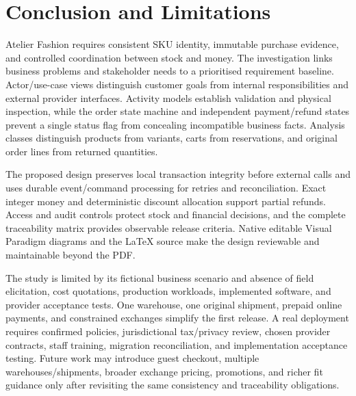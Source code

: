 \chapter{Conclusion and Limitations}
Atelier Fashion requires consistent SKU identity, immutable purchase evidence, and controlled coordination between stock and money. The investigation links business problems and stakeholder needs to a prioritised requirement baseline. Actor/use-case views distinguish customer goals from internal responsibilities and external provider interfaces. Activity models establish validation and physical inspection, while the order state machine and independent payment/refund states prevent a single status flag from concealing incompatible business facts. Analysis classes distinguish products from variants, carts from reservations, and original order lines from returned quantities.

The proposed design preserves local transaction integrity before external calls and uses durable event/command processing for retries and reconciliation. Exact integer money and deterministic discount allocation support partial refunds. Access and audit controls protect stock and financial decisions, and the complete traceability matrix provides observable release criteria. Native editable Visual Paradigm diagrams and the LaTeX source make the design reviewable and maintainable beyond the PDF.

The study is limited by its fictional business scenario and absence of field elicitation, cost quotations, production workloads, implemented software, and provider acceptance tests. One warehouse, one original shipment, prepaid online payments, and constrained exchanges simplify the first release. A real deployment requires confirmed policies, jurisdictional tax/privacy review, chosen provider contracts, staff training, migration reconciliation, and implementation acceptance testing. Future work may introduce guest checkout, multiple warehouses/shipments, broader exchange pricing, promotions, and richer fit guidance only after revisiting the same consistency and traceability obligations.
